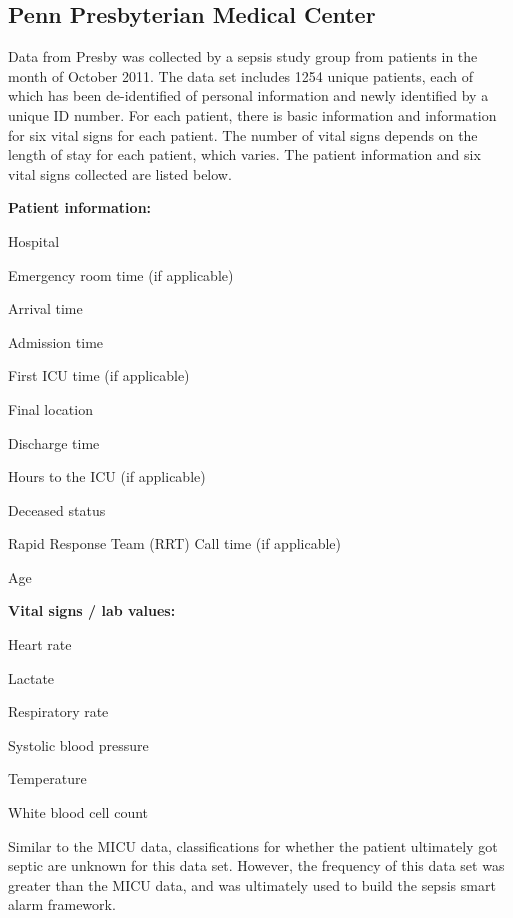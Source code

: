 \documentclass{sig-alternate}
\begin{document}
\vspace{10pt}
\subsection{Penn Presbyterian Medical Center}
\label{subsec:presby}
\vspace{10pt}

Data from Presby was collected by a sepsis study group from patients in the month of October 2011.  The data set includes 1254 unique patients, each of which has been de-identified of personal information and newly identified by a unique ID number.  For each patient, there is basic information and information for six vital signs for each patient.  The number of vital signs depends on the length of stay for each patient, which varies.  The patient information and six vital signs collected are listed below.
\linebreak

\noindent \textbf{Patient information:}
\begin{itemize*}
  \item Hospital
  \item Emergency room time (if applicable)
  \item Arrival time
  \item Admission time
  \item First ICU time (if applicable)
  \item Final location
  \item Discharge time
  \item Hours to the ICU (if applicable)
  \item Deceased status
  \item Rapid Response Team (RRT) Call time (if applicable)
  \item Age
\end{itemize*}

\noindent \textbf{Vital signs / lab values:}
\begin{itemize*}
  \item Heart rate
  \item Lactate
  \item Respiratory rate
  \item Systolic blood pressure
  \item Temperature
  \item White blood cell count
\end{itemize*}

Similar to the MICU data, classifications for whether the patient ultimately got septic are unknown for this data set.  However, the frequency of this data set was greater than the MICU data, and was ultimately used to build the sepsis smart alarm framework.  
\end{document}
